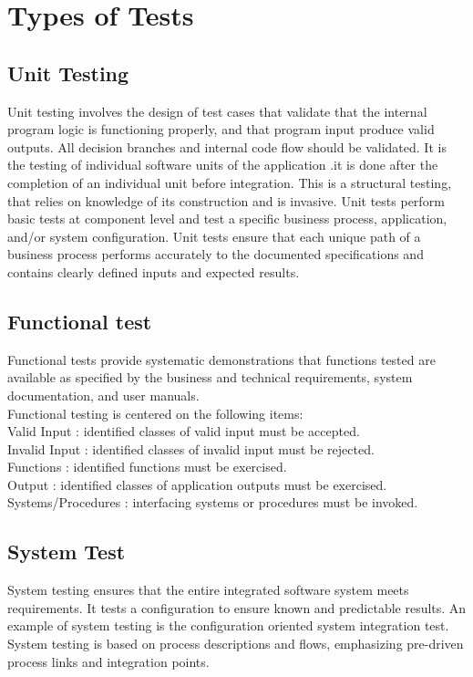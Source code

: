 \documentclass[BTech]{srmuthesis}
\begin{document}
\section{Types of Tests}
\subsection{Unit Testing}
Unit testing involves the design of test cases that validate that the internal program logic is functioning properly, and that program input produce valid outputs. All decision branches and internal code flow should be validated. It is the testing of individual software units of the application .it is done after the completion of an individual unit before integration. This is a structural testing, that relies on knowledge of its construction and is invasive. Unit tests perform basic tests at component level and test a specific business process, application, and/or system configuration. Unit tests ensure that each unique path of a business process performs accurately to the documented specifications and contains clearly defined inputs and expected results.
\subsection{Functional test}
Functional tests provide systematic demonstrations that functions tested are available as specified by the business and technical requirements, system documentation, and user manuals.\\
Functional testing is centered on the following items:\\
Valid Input : identified classes of valid input must be accepted.\\
Invalid Input : identified classes of invalid input must be rejected.\\
Functions : identified functions must be exercised.\\
Output : identified classes of application outputs must be exercised.\\
Systems/Procedures : interfacing systems or procedures must be invoked.
\subsection{System Test}
System testing ensures that the entire integrated software system meets requirements. It tests a configuration to ensure known and predictable results. An example of system testing is the configuration oriented system integration test. System testing is based on process descriptions and flows, emphasizing pre-driven process links and integration points.
\end{document}
